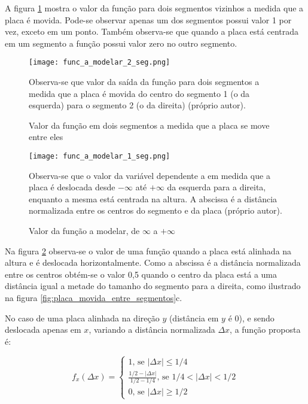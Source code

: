 A figura \ref{fig:func_a_modelar_2_seg} mostra o valor da função para
dois segmentos vizinhos a medida que a placa é movida. Pode-se observar apenas
um dos segmentos possui valor 1 por vez, exceto em um ponto. Também observa-se
que quando a placa está centrada em um segmento a função possui valor zero
no outro segmento.

\begin{figure}[!htb]
	\centering
	\texttt{[image: func\_a\_modelar\_2\_seg.png]}
	\caption{Valor da função em dois segmentos a medida que a placa se move
	entre eles}
	\label{fig:func_a_modelar_2_seg}
	Observa-se que valor da saída da função para dois segmentos a medida que a
	placa é movida do centro do segmento 1 (o da esquerda) para o segmento 2 (o
	da direita) (próprio autor).
\end{figure}

\begin{figure}[!htb]
	\centering
	\texttt{[image: func\_a\_modelar\_1\_seg.png]}
	\caption{Valor da função a modelar, de $\infty$ a $+\infty$}
	\label{fig:func_a_modelar_1_seg}
	Observa-se que o valor da variável dependente a em medida que a placa
	é deslocada desde $-\infty$ até $+\infty$ da esquerda para a direita,
	enquanto a mesma está centrada na altura. A abscissa é a distância
	normalizada entre os centros do segmento e da placa (próprio autor).
\end{figure}

Na figura \ref{fig:func_a_modelar_1_seg} observa-se o valor de uma função
quando a placa está alinhada na altura e é deslocada horizontalmente. Como
a abscissa é a distância normalizada entre os centros obtém-se o valor 0,5
quando o centro da placa está a uma distância igual a metade do tamanho do
segmento para a direita, como ilustrado na figura
\ref{fig:placa_movida_entre_segmentos}c.

No caso de uma placa alinhada na direção $y$ (distância em $y$ é 0), e sendo
deslocada apenas em $x$, variando a distância normalizada $\Delta x$, a função
proposta é:

\begin{equation}
	f_x(\Delta x) = \begin{cases}
		1 \text{, se } |\Delta x| \leq 1/4
		\\
		\frac{1/2-|\Delta x|}{1/2-1/4} \text{, se } 1/4<|\Delta x|<1/2
		\\
		0 \text{, se } |\Delta x| \geq 1/2
	\end{cases}
\end{equation}

